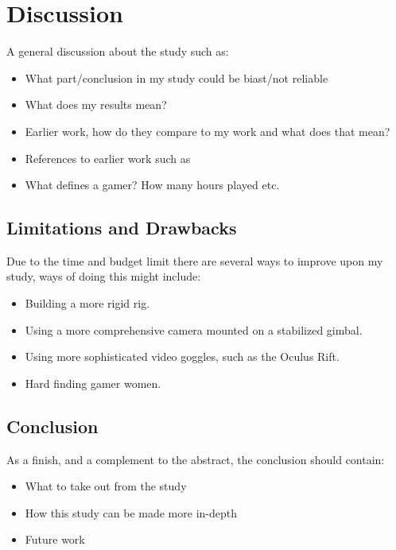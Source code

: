 \documentclass[runningheads,a4paper,oribibl]{llncs}
\begin{document}

\section{Discussion}
A general discussion about the study such as:
\begin{itemize}
	\item What part/conclusion in my study could be biast/not reliable
	\item What does my results mean?
	\item Earlier work, how do they compare to my work and what does that mean?
	\item References to earlier work such as~\cite{schmierbach2011exploring}
	\item What defines a gamer? How many hours played etc.
\end{itemize}



\subsection{Limitations and Drawbacks}
Due to the time and budget limit there are several ways to improve upon my study, ways of doing this might include:
\begin{itemize}
	\item Building a more rigid rig.
	\item Using a more comprehensive camera mounted on a stabilized gimbal.
	\item Using more sophisticated video goggles, such as the Oculus Rift.
	\item Hard finding gamer women.
\end{itemize}




\subsection{Conclusion}
As a finish, and a complement to the abstract, the conclusion should contain:
\begin{itemize}
	\item What to take out from the study
	\item How this study can be made more in-depth
	\item Future work
\end{itemize}
\end{document}
